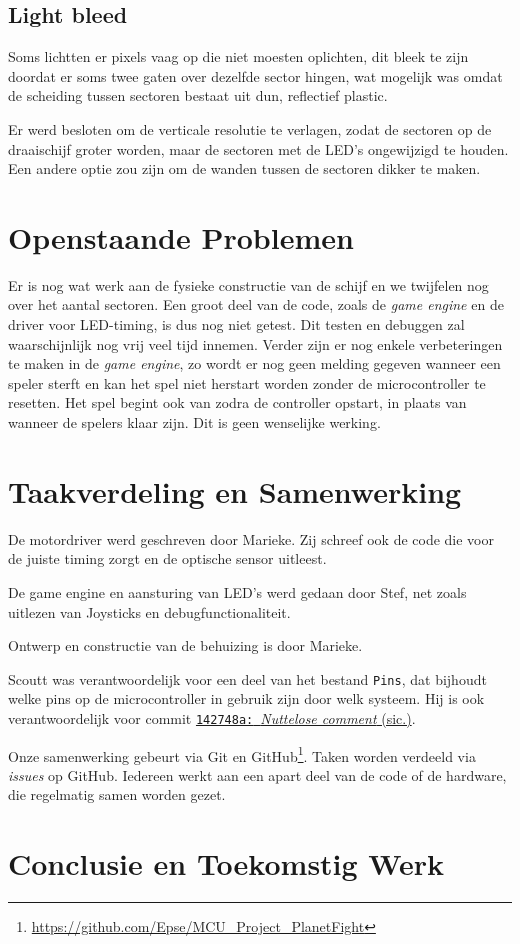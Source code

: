 \documentclass[12pt]{ugentreport}
\begin{document}
\subsection{Light bleed}
Soms lichtten er pixels vaag op die niet moesten oplichten,
dit bleek te zijn doordat er soms twee gaten over dezelfde sector hingen, wat
mogelijk was omdat de scheiding tussen sectoren bestaat uit dun, reflectief
plastic.

Er werd besloten om de verticale resolutie te verlagen, zodat de sectoren op de
draaischijf groter worden, maar de sectoren met de LED's ongewijzigd te houden.
Een andere optie zou zijn om de wanden tussen de sectoren dikker te maken.

\section{Openstaande Problemen}
Er is nog wat werk aan de fysieke constructie van de schijf en we twijfelen nog
over het aantal sectoren. Een groot deel van de code, zoals de \emph{game
  engine} en de driver voor LED-timing, is dus nog niet getest.
Dit testen en debuggen zal waarschijnlijk nog vrij veel tijd innemen.
Verder zijn er nog enkele verbeteringen te maken in de \emph{game engine},
zo wordt er nog geen melding gegeven wanneer een speler sterft en kan het spel
niet herstart worden zonder de microcontroller te resetten.
Het spel begint ook van zodra de controller opstart, in plaats van wanneer de
spelers klaar zijn. Dit is geen wenselijke werking.

\section{Taakverdeling en Samenwerking}
De motordriver werd geschreven door Marieke. Zij schreef ook de code die voor de
juiste timing zorgt en de optische sensor uitleest.

De game engine en aansturing van LED's werd gedaan door Stef,
net zoals uitlezen van Joysticks en debugfunctionaliteit.

Ontwerp en constructie van de behuizing is door Marieke.

Scoutt was verantwoordelijk voor een deel van het bestand \texttt{Pins},
dat bijhoudt welke pins op de microcontroller in gebruik zijn door welk systeem.
Hij is ook verantwoordelijk voor commit
\href{https://github.com/Epse/MCU_Project_PlanetFight/commit/142748a7c49a4552b92dfe5613a2f1f7b7a7eb75}{\texttt{142748a:}~\emph{Nuttelose
    comment} (sic.)}.

Onze samenwerking gebeurt via Git en
GitHub\footnote{\url{https://github.com/Epse/MCU_Project_PlanetFight}}. Taken worden
verdeeld via \emph{issues} op GitHub. Iedereen werkt aan een apart deel van de
code of de hardware, die regelmatig samen worden gezet.

\section{Conclusie en Toekomstig Werk}
\end{document}
